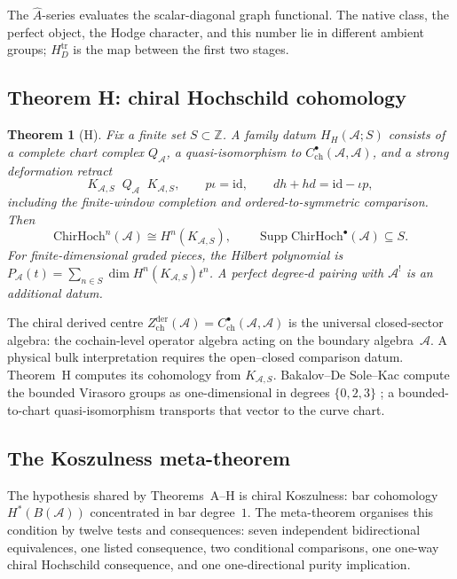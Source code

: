 \documentclass[11pt,reqno]{amsart}
\newtheorem{theorem}{Theorem}[section]
\theoremstyle{definition}
\theoremstyle{remark}
\providecommand{\cA}{\mathcal{A}}
\providecommand{\id}{\mathrm{id}}
\providecommand{\ChirHoch}{\mathrm{ChirHoch}}
\numberwithin{equation}{section}
\begin{document}
The $\hat A$-series evaluates the scalar-diagonal graph functional.
The native class, the perfect object, the Hodge character, and this
number lie in different ambient groups; $H_D^{\mathrm{tr}}$ is the
map between the first two stages.

\subsection{Theorem H: chiral Hochschild cohomology}
\label{ssec:thm-h}

\begin{theorem}[H]\label{thm:H}
Fix a finite set $S\subset\mathbb Z$.  A family datum
$H_H(\cA;S)$ consists of a complete chart complex $Q_\cA$, a
quasi-isomorphism to $C^\bullet_{\mathrm{ch}}(\cA,\cA)$, and a
strong deformation retract
\[
 K_{\cA,S}\mathop{\xrightarrow{\ \iota\ }}Q_\cA
 \mathop{\xrightarrow{\ p\ }}K_{\cA,S},
 \qquad p\iota=\id,
 \qquad dh+hd=\id-\iota p,
\]
including the finite-window completion and ordered-to-symmetric
comparison.  Then
\[
 \ChirHoch^n(\cA)\cong H^n(K_{\cA,S}),
 \qquad
 \operatorname{Supp}\ChirHoch^\bullet(\cA)\subseteq S.
\]
For finite-dimensional graded pieces, the Hilbert polynomial is
$P_\cA(t)=\sum_{n\in S}\dim H^n(K_{\cA,S})t^n$.  A perfect
degree-$d$ pairing with $\cA^!$ is an additional datum.
\end{theorem}

The chiral derived centre
$Z^{\mathrm{der}}_{\mathrm{ch}}(\cA) =
C^{\bullet}_{\mathrm{ch}}(\cA, \cA)$ is the universal
closed-sector algebra: the cochain-level operator algebra acting on
the boundary algebra~$\cA$. A physical bulk interpretation requires
the open--closed comparison datum. Theorem~H computes its cohomology
from $K_{\cA,S}$.  Bakalov--De Sole--Kac compute the bounded
Virasoro groups as one-dimensional in degrees $\{0,2,3\}$
\cite[Theorem~7.2]{BDSK21}; a
bounded-to-chart quasi-isomorphism transports that vector to the
curve chart.

\subsection{The Koszulness meta-theorem}
\label{ssec:meta-theorem}

The hypothesis shared by Theorems~A--H is chiral
Koszulness: bar cohomology $H^*(B(\cA))$ concentrated in
bar degree~$1$. The meta-theorem organises this condition by
twelve tests and consequences: seven independent bidirectional
equivalences, one listed consequence, two conditional
comparisons, one one-way chiral Hochschild consequence, and one
one-directional purity implication.
\end{document}
